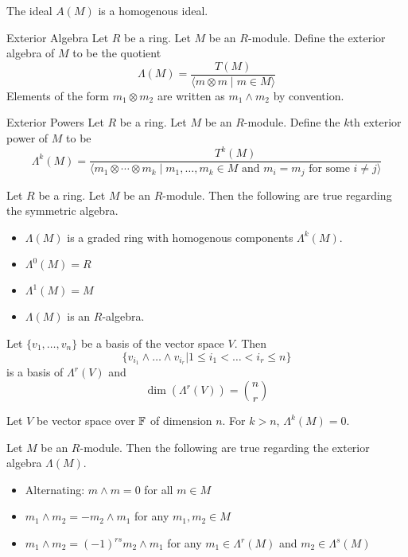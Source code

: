 \documentclass[a4paper]{article}
\begin{document}
\begin{lmm}{}{} The ideal $A(M)$ is a homogenous ideal. 
\end{lmm}

\begin{defn}{Exterior Algebra}{} Let $R$ be a ring. Let $M$ be an $R$-module. Define the exterior algebra of $M$ to be the quotient $$\Lambda(M)=\frac{T(M)}{\langle m\otimes m\;|\;m\in M\rangle}$$ Elements of the form $m_1\otimes m_2$ are written as $m_1\wedge m_2$ by convention. 
\end{defn}

\begin{defn}{Exterior Powers}{} Let $R$ be a ring. Let $M$ be an $R$-module. Define the $k$th exterior power of $M$ to be $$\Lambda^k(M)=\frac{T^k(M)}{\langle m_1\otimes\cdots\otimes m_k\;|\;m_1,\dots,m_k\in M\text{ and }m_i=m_j\text{ for some }i\neq j\rangle}$$
\end{defn}

\begin{prp}{}{} Let $R$ be a ring. Let $M$ be an $R$-module. Then the following are true regarding the symmetric algebra. 
\begin{itemize}
\item $\Lambda(M)$ is a graded ring with homogenous components $\Lambda^k(M)$. 
\item $\Lambda^0(M)=R$
\item $\Lambda^1(M)=M$
\item $\Lambda(M)$ is an $R$-algebra. 
\end{itemize}
\end{prp}

\begin{prp}{}{} Let $\{v_1,\dots,v_n\}$ be a basis of the vector space $V$. Then $$\{v_{i_1}\wedge\dots\wedge v_{i_r}|1\leq i_1<\dots<i_r\leq n\}$$ is a basis of $\Lambda^r(V)$ and $$\dim(\Lambda^r(V))=\binom{n}{r}$$
\end{prp}

\begin{crl}{}{} Let $V$ be vector space over $\mathbb{F}$ of dimension $n$. For $k>n$, $\Lambda^k(M)=0$. 
\end{crl}

\begin{lmm}{}{} Let $M$ be an $R$-module. Then the following are true regarding the exterior algebra $\Lambda(M)$. 
\begin{itemize}
\item Alternating: $m\wedge m=0$ for all $m\in M$
\item $m_1\wedge m_2=-m_2\wedge m_1$ for any $m_1,m_2\in M$
\item $m_1\wedge m_2=(-1)^{rs}m_2\wedge m_1$ for any $m_1\in\Lambda^r(M)$ and $m_2\in\Lambda^s(M)$
\end{itemize}
\end{lmm}
\end{document}
